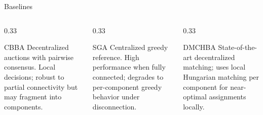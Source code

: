 \documentclass[aspectratio=169, 11pt]{beamer}
\newcommand{\smallcap}[1]{{\rmfamily\small\color{TextSecondary} #1}}
\begin{document}
\begin{frame}{Baselines}
  \begin{columns}[T]
    \begin{column}{0.33\textwidth}
      \begin{plaincard}{CBBA}
        \smallcap{Decentralized auctions with pairwise consensus. Local
                  decisions; robust to partial connectivity but may
                  fragment into components.}
      \end{plaincard}
    \end{column}
    \begin{column}{0.33\textwidth}
      \begin{plaincard}{SGA}
        \smallcap{Centralized greedy reference. High performance when
                  fully connected; degrades to per-component greedy
                  behavior under disconnection.}
      \end{plaincard}
    \end{column}
    \begin{column}{0.33\textwidth}
      \begin{plaincard}{DMCHBA}
        \smallcap{State-of-the-art decentralized matching; uses local
                  Hungarian matching per component for near-optimal
                  assignments locally.}
      \end{plaincard}
    \end{column}
  \end{columns}
\end{frame}
\end{document}
